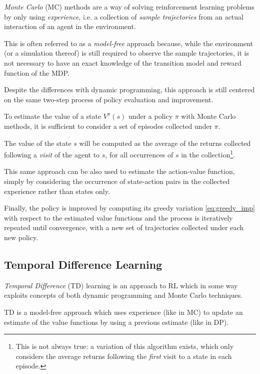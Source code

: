 \textit{Monte Carlo} (MC) methods are a way of solving reinforcement learning problems by 
only using \textit{experience}, i.e. a collection of \textit{sample trajectories}
from an actual interaction of an agent in the environment.

This is often referred to as a \textit{model-free} approach because, while the
environment (or a simulation thereof) is still required to observe the sample
trajectories, it is not necessary to have an exact knowledge of the transition 
model and reward function of the MDP. 

Despite the differences with dynamic programming, this approach is still 
centered on the same two-step process of policy evaluation and improvement.

To estimate the value of a state $V^\pi(s)$ under a policy $\pi$ with Monte 
Carlo methods, it is sufficient to consider a set of episodes collected under 
$\pi$.

The value of the state $s$ will be computed as the average of the returns 
collected following a \textit{visit} of the agent to $s$, for all occurrences of
$s$ in the collection\footnote{This is not always true: a variation of this 
algorithm exists, which only considers the average returns following the 
\textit{first} visit to a state in each episode.}.

This same approach can be also used to estimate the action-value function, simply
by considering the occurrence of state-action pairs in the collected experience
rather than states only. 

Finally, the policy is improved by computing its greedy variation \eqref{eq:greedy_imp}
with respect to the estimated value functions and the process is iteratively
repeated until convergence, with a new set of trajectories collected under each 
new policy.

\subsection{Temporal Difference Learning}
\textit{Temporal Difference} (TD) learning is an approach to RL which in some 
way exploits concepts of both dynamic programming and Monte Carlo techniques. 

TD is a model-free approach which uses experience (like in MC)
to update an estimate of the value functions by using a previous estimate 
(like in DP).

